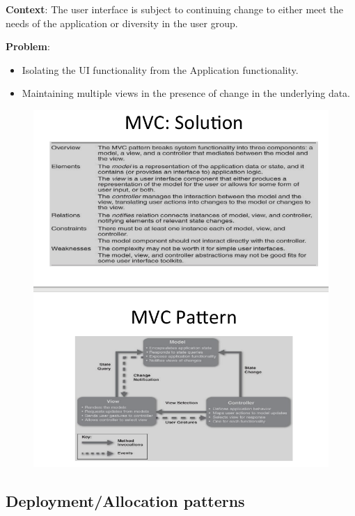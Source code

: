 \documentclass{article}
\begin{document}
\textbf{Context}: The user interface is subject to continuing change to either
meet the needs of the application or diversity in the user group.

\textbf{Problem}:
\begin{itemize}
\item
  Isolating the UI functionality from the Application functionality.
\item
  Maintaining multiple views in the presence of change in the underlying data.
\end{itemize}


\begin{figure}[H]
\centering
  \includegraphics[width=1\linewidth]
  {images/mvc.png}
\end{figure}

\subsection{Deployment/Allocation patterns}

\end{document}
